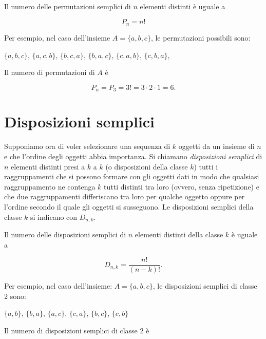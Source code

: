 \documentclass[
  11pt,
]{krantz}
\theoremstyle{definition}
\theoremstyle{definition}
\theoremstyle{definition}
\theoremstyle{definition}
\theoremstyle{remark}
\begin{document}
Il numero delle permutazioni semplici di \(n\) elementi distinti è uguale a

\begin{equation}
P_n = n!
\label{eq:permsem}
\end{equation}

Per esempio, nel caso dell'insieme \(A = \{a, b, c\}\), le permutazioni possibili sono:

\begin{center}
$\{a, b, c\}$, $\{a, c, b\}$, $\{b, c, a\}$, $\{b, a, c\}$, $\{c, a, b\}$, $\{c, b, a\}$,
\end{center}

Il numero di permutazioni di \(A\) è

\[
P_n = P_3 = 3! = 3 \cdot 2 \cdot 1 = 6.
\]

\hypertarget{disposizioni-semplici}{%
\section{Disposizioni semplici}\label{disposizioni-semplici}}

Supponiamo ora di voler selezionare una sequenza di \(k\) oggetti da un insieme di \(n\) e che l'ordine degli oggetti abbia importanza. Si chiamano \emph{disposizioni semplici} di \(n\) elementi distinti presi a \(k\) a \(k\) (o disposizioni della classe \(k\)) tutti i raggruppamenti che si possono formare con gli oggetti dati in modo che qualsiasi raggruppamento ne contenga \(k\) tutti distinti tra loro (ovvero, senza ripetizione) e che due raggruppamenti differiscano tra loro per qualche oggetto oppure per l'ordine secondo il quale gli oggetti si susseguono. Le disposizioni semplici della classe \(k\) si indicano con \(D_{n,k}\).

Il numero delle disposizioni semplici di \(n\) elementi distinti della classe \(k\) è uguale a

\begin{equation}
D_{n,k} = \frac{n!}{(n-k)!}.
\label{eq:dispsemp}
\end{equation}

Per esempio, nel caso dell'insieme: \(A = \{a, b, c\}\), le disposizioni semplici di classe 2 sono:

\begin{center}
$\{a, b\}$, $\{b, a\}$, $\{a, c\}$, $\{c, a\}$, $\{b, c\}$, $\{c, b\}$
\end{center}

Il numero di disposizioni semplici di classe 2 è
\end{document}
